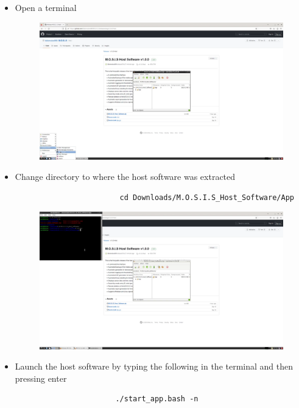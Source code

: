 \documentclass[12pt]{article}
\begin{document}
\begin{center}
\begin{itemize}
\begin{figure}[H]
		      \end{figure}
		\item Open a terminal
		      \begin{figure}[H]
			      \includegraphics[width=\textwidth]{Figures/Linux-Open-terminal.png}
		      \end{figure}
		\item Change directory to where the host software was extracted
		      \begin{verbatim}
                        cd Downloads/M.O.S.I.S_Host_Software/App
                      \end{verbatim}
		      \begin{figure}[H]
			      \includegraphics[width=\textwidth]{Figures/Linux-cd-Host-Software.png}
		      \end{figure}
		\item Launch the host software by typing the following in the terminal and then pressing enter
		      \begin{verbatim}
                       ./start_app.bash -n 
                      \end{verbatim}

\end{itemize}
\end{center}
\end{document}
